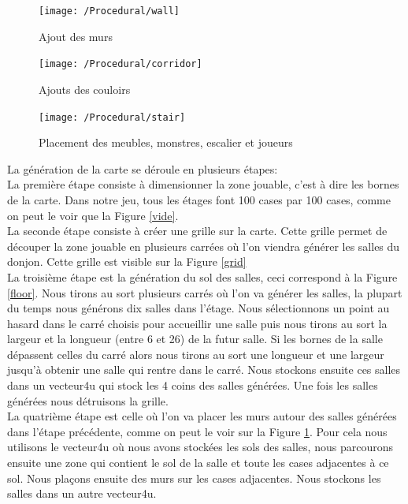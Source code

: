 \documentclass[a4paper, 12pt]{article}
\begin{document}
\begin{figure}
\center
\texttt{[image: /Procedural/wall]}
\caption{Ajout des murs}
\label{wall}
\end{figure}

\begin{figure}
\center
\texttt{[image: /Procedural/corridor]}
\caption{Ajouts des couloirs}
\label{corridor}
\end{figure}

\begin{figure}
\center
\texttt{[image: /Procedural/stair]}
\caption{Placement des meubles, monstres, escalier et joueurs}
\label{stair}
\end{figure}

La génération de la carte se déroule en plusieurs étapes: \\

La première étape consiste à dimensionner la zone jouable, c'est à dire les bornes de la carte. Dans notre jeu, tous les étages font 100 cases par 100 cases, comme on peut le voir que la Figure \ref{vide}.  \\

La seconde étape consiste à créer une grille sur la carte. Cette grille permet de découper la zone jouable en plusieurs carrées où l'on viendra générer les salles du donjon. Cette grille est visible sur la Figure \ref{grid}  \\

La troisième étape est la génération du sol des salles, ceci correspond à la Figure \ref{floor}. Nous tirons au sort plusieurs carrés où l'on va générer les salles, la plupart du temps nous générons dix salles dans l'étage. Nous sélectionnons un point au hasard dans le carré choisis pour accueillir une salle puis nous tirons au sort la largeur et la longueur (entre 6 et 26) de la futur salle. Si les bornes de la salle dépassent celles du carré alors nous tirons au sort une longueur et une largeur jusqu'à obtenir une salle qui rentre dans le carré. Nous stockons ensuite ces salles dans un vecteur4u qui stock les 4 coins des salles générées. Une fois les salles générées nous détruisons la grille. \\

La quatrième étape est celle où l'on va placer les murs autour des salles générées dans l'étape précédente, comme on peut le voir sur la Figure \ref{wall}. Pour cela nous utilisons le vecteur4u où nous avons stockées les sols des salles, nous parcourons ensuite une zone qui contient le sol de la salle et toute les cases adjacentes à ce sol. Nous plaçons ensuite des murs sur les cases adjacentes. Nous stockons les salles dans un autre vecteur4u. \\
\end{document}
